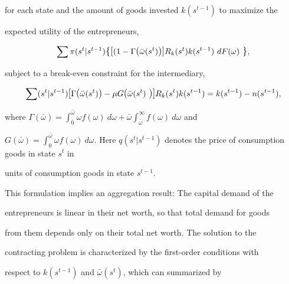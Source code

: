 \documentclass[fleqn,leqno,11pt]{article}
\begin{document}
for each state and the amount of goods invested $k(s^{t-1})$ to maximize the

expected utility of the entrepreneurs, 

\[

\sum \pi (s^{t}|s^{t-1})\text{{\large \{[}}(1-\Gamma \text{{\large (}}\bar{%

\omega}(s^{t})\text{{\large )]}}R_{k}(s^{t})k(s^{t-1})~dF(\omega )\text{%

{\large \}}}, 

\]

subject to a break-even constraint for the intermediary, 

\begin{equation}

\sum (s^{t}|s^{t-1})\text{{\large [}}\Gamma \text{{\large (}}\bar{\omega}%

(s^{t})\text{{\large )}}-\mu G\text{{\large (}}\bar{\omega}(s^{t})\text{%

{\large )]}}R_{k}(s^{t})k(s^{t-1})=k(s^{t-1})-n(s^{t-1}),  \label{breakeven}

\end{equation}

where $\Gamma (\bar{\omega})=\int_{0}^{\bar{\omega}}\omega f(\omega

)~d\omega +\bar{\omega}\int_{\bar{\omega}}^{\infty }f(\omega )~d\omega $ and 

$G(\bar{\omega})=\int_{0}^{\bar{\omega}}\omega f(\omega )~d\omega .$ Here $%

q(s^{t}|s^{t-1})$ denotes the price of consumption goods in state $s^{t}$ in

units of consumption goods in state $s^{t-1}.$



This formulation implies an aggregation result: The capital demand of the

entrepreneurs is linear in their net worth, so that total demand for goods

from them depends only on their total net worth. The solution to the

contracting problem is characterized by the first-order conditions with

respect to $k(s^{t-1})$ and $\bar{\omega}(s^{t})$, which can summarized by 
\end{document}
